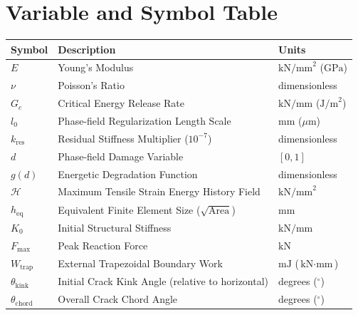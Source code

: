 \documentclass[11pt,a4paper]{article}
\begin{document}



\appendix
\section{Variable and Symbol Table}
\begin{table}[htbp]
\centering
\small
\begin{tabularx}{\textwidth}{lp{8.5cm}X}
\toprule
\textbf{Symbol} & \textbf{Description} & \textbf{Units} \\
\midrule
$E$ & Young's Modulus & $\text{kN/mm}^2$ ($\text{GPa}$) \\
$\nu$ & Poisson's Ratio & dimensionless \\
$G_c$ & Critical Energy Release Rate & $\text{kN/mm}$ ($\text{J/m}^2$) \\
$l_0$ & Phase-field Regularization Length Scale & $\text{mm}$ ($\mu\text{m}$) \\
$k_{\mathrm{res}}$ & Residual Stiffness Multiplier ($10^{-7}$) & dimensionless \\
$d$ & Phase-field Damage Variable & $[0, 1]$ \\
$g(d)$ & Energetic Degradation Function & dimensionless \\
$\mathcal{H}$ & Maximum Tensile Strain Energy History Field & $\text{kN/mm}^2$ \\
$h_{\mathrm{eq}}$ & Equivalent Finite Element Size ($\sqrt{\text{Area}}$) & $\text{mm}$ \\
$K_0$ & Initial Structural Stiffness & $\text{kN/mm}$ \\
$F_{\max}$ & Peak Reaction Force & $\text{kN}$ \\
$W_{\mathrm{trap}}$ & External Trapezoidal Boundary Work & $\text{mJ}$ ($\text{kN}\cdot\text{mm}$) \\
$\theta_{\mathrm{kink}}$ & Initial Crack Kink Angle (relative to horizontal) & degrees ($^\circ$) \\
$\theta_{\mathrm{chord}}$ & Overall Crack Chord Angle & degrees ($^\circ$) \\
\bottomrule
\end{tabularx}
\end{table}
\end{document}
